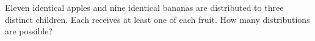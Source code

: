 Eleven identical apples and nine identical bananas are distributed to three distinct children. Each receives at least one of each fruit. How many distributions are possible?
